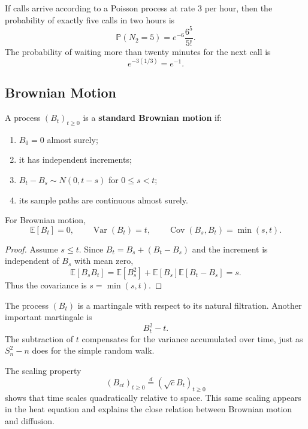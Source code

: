 \begin{example}
If calls arrive according to a Poisson process at rate $3$ per hour, then the probability of exactly five calls in two hours is
\[
    \mathbb{P}(N_2=5)=e^{-6}\frac{6^5}{5!}.
\]
The probability of waiting more than twenty minutes for the next call is
\[
    e^{-3(1/3)}=e^{-1}.
\]
\end{example}

\subsection{Brownian Motion}

\begin{definition}
A process $(B_t)_{t\geq0}$ is a \textbf{standard Brownian motion} if:
\begin{enumerate}
    \item $B_0=0$ almost surely;
    \item it has independent increments;
    \item $B_t-B_s\sim N(0,t-s)$ for $0\leq s<t$;
    \item its sample paths are continuous almost surely.
\end{enumerate}
\end{definition}

\begin{proposition}
For Brownian motion,
\[
    \mathbb{E}[B_t]=0,
    \qquad
    \operatorname{Var}(B_t)=t,
    \qquad
    \operatorname{Cov}(B_s,B_t)=\min(s,t).
\]
\end{proposition}

\begin{proof}
Assume $s\leq t$. Since $B_t=B_s+(B_t-B_s)$ and the increment is independent of $B_s$ with mean zero,
\[
    \mathbb{E}[B_sB_t]
    =\mathbb{E}[B_s^2]
     +\mathbb{E}[B_s]\mathbb{E}[B_t-B_s]
    =s.
\]
Thus the covariance is $s=\min(s,t)$.
\end{proof}



\begin{example}
The process $(B_t)$ is a martingale with respect to its natural filtration. Another important martingale is
\[
    B_t^2-t.
\]
The subtraction of $t$ compensates for the variance accumulated over time, just as $S_n^2-n$ does for the simple random walk.
\end{example}

\begin{remark}
The scaling property
\[
    (B_{ct})_{t\geq0}
    \overset{d}{=}
    (\sqrt{c}B_t)_{t\geq0}
\]
shows that time scales quadratically relative to space. This same scaling appears in the heat equation and explains the close relation between Brownian motion and diffusion.
\end{remark}

